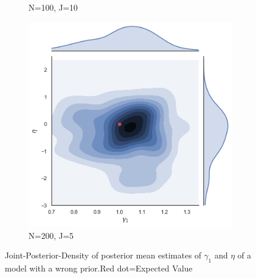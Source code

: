 \begin{figure}[h!]
\begin{subfigure}[b]{0.3\linewidth}
    \caption{N=100, J=10}
  \end{subfigure}
  \begin{subfigure}[b]{0.3\linewidth}
    \includegraphics[width=\linewidth]{graphics/jointplot_gamma1eta_smallJ}
    \caption{ N=200, J=5}
  \end{subfigure}
  \caption{Joint-Posterior-Density of posterior mean estimates of $\gamma_1$ and $\eta$ of a model with a wrong prior.Red dot=Expected Value}
  \label{fig:various sample size}
\end{figure}


